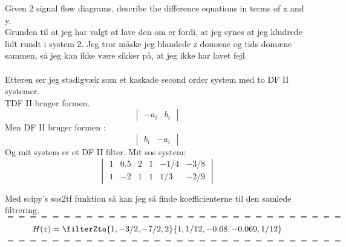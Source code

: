 \begin{Opgaver}
\begin{kapitel}
\begin{Opgave}
        \end{Opgave}
        \begin{Opgave}
            Given 2 signal flow diagrams, describe the difference equations in terms of x and y. 
            \\
            Grunden til at jeg har valgt at lave den om er fordi, at jeg synes at jeg kludrede lidt rundt i system 2. 
            Jeg tror måske jeg blandede z domæne og tids domæne sammen, så jeg kan ikke være sikker på, at jeg ikke har lavet fejl.\\\\
                       
            
            Etteren ser jeg stadigvæk som et kaskade second order system med to DF II systemer.\\
            TDF II bruger formen. 
            \[\begin{vmatrix}
                -a_i & b_i
            \end{vmatrix}\]
            Men DF II bruger formen :
            \[\begin{vmatrix}
                b_i & -a_i
            \end{vmatrix}\]
            Og mit system er et DF II filter.
            Mit sos system: 
            \[\begin{vmatrix}
                1 & 0.5 & 2 & 1 & -1/4 & -3/8 \\
                1 &  -2 & 1 & 1 &  1/3 & -2/9
            \end{vmatrix}\]

            Med scipy's sos2tf funktion så kan jeg så finde koefficienterne til den samlede filtrering.
            \[==============================\]
            \[H(z) = \filterZto{1, -3/2, -7/2, 2}{1, 1/12, -0.68, -0.069, 1/12}\]
            \[==============================\]\\\\\\ 
            

\end{Opgave}
\end{kapitel}
\end{Opgaver}
